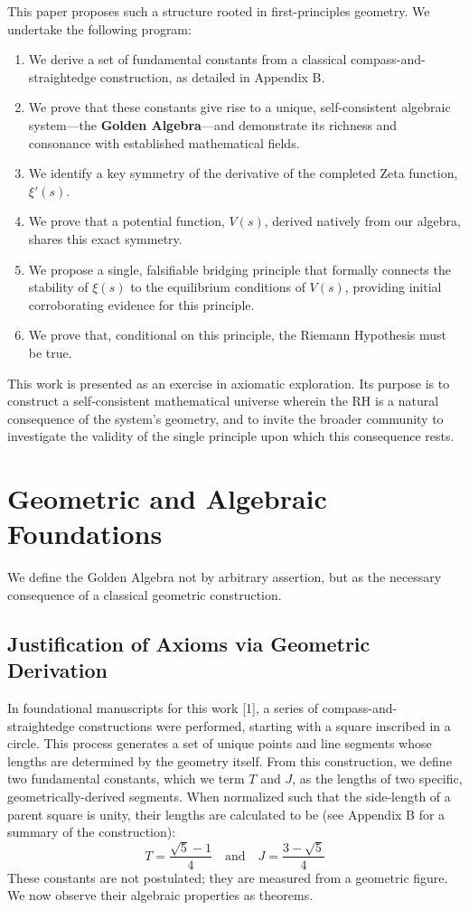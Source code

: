 \documentclass{article}
\theoremstyle{plain}
\theoremstyle{definition}
\theoremstyle{remark}
\begin{document}
This paper proposes such a structure rooted in first-principles geometry. We undertake the following program:
\begin{enumerate}
    \item We derive a set of fundamental constants from a classical compass-and-straightedge construction, as detailed in Appendix B.
    \item We prove that these constants give rise to a unique, self-consistent algebraic system—the \textbf{Golden Algebra}—and demonstrate its richness and consonance with established mathematical fields.
    \item We identify a key symmetry of the derivative of the completed Zeta function, $\xi'(s)$.
    \item We prove that a potential function, $V(s)$, derived natively from our algebra, shares this exact symmetry.
    \item We propose a single, falsifiable bridging principle that formally connects the stability of $\xi(s)$ to the equilibrium conditions of $V(s)$, providing initial corroborating evidence for this principle.
    \item We prove that, conditional on this principle, the Riemann Hypothesis must be true.
\end{enumerate}
This work is presented as an exercise in axiomatic exploration. Its purpose is to construct a self-consistent mathematical universe wherein the RH is a natural consequence of the system's geometry, and to invite the broader community to investigate the validity of the single principle upon which this consequence rests.

\section{Geometric and Algebraic Foundations}
We define the Golden Algebra not by arbitrary assertion, but as the necessary consequence of a classical geometric construction.

\subsection{Justification of Axioms via Geometric Derivation}
In foundational manuscripts for this work [1], a series of compass-and-straightedge constructions were performed, starting with a square inscribed in a circle. This process generates a set of unique points and line segments whose lengths are determined by the geometry itself. From this construction, we define two fundamental constants, which we term $T$ and $J$, as the lengths of two specific, geometrically-derived segments. When normalized such that the side-length of a parent square is unity, their lengths are calculated to be (see Appendix B for a summary of the construction):
$$ T = \frac{\sqrt{5}-1}{4} \quad \text{and} \quad J = \frac{3-\sqrt{5}}{4} $$
These constants are not postulated; they are measured from a geometric figure. We now observe their algebraic properties as theorems.
\end{document}
